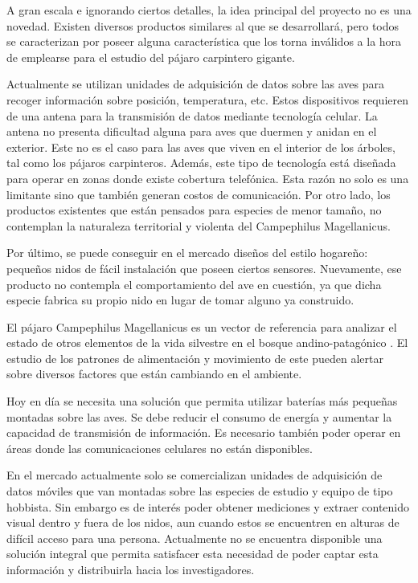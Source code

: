 %

%


A gran escala e ignorando ciertos detalles, la idea principal del proyecto no es una novedad. Existen diversos productos similares al que se desarrollará, pero todos se caracterizan por poseer alguna característica que los torna inválidos a la hora de emplearse para el estudio del pájaro carpintero gigante.

Actualmente se utilizan unidades de adquisición de datos sobre las aves para recoger información sobre posición, temperatura, etc. Estos dispositivos requieren de una antena para la transmisión de datos mediante tecnología celular. La antena no presenta dificultad alguna para aves que duermen y anidan en el exterior. Este no es el caso para las aves que viven en el interior de los árboles, tal como los pájaros carpinteros. Además, este tipo de tecnología está diseñada para operar en zonas donde existe cobertura telefónica. Esta razón no solo es una limitante sino que también generan costos de comunicación. Por otro lado, los productos existentes que están pensados para especies de menor tamaño, no contemplan la naturaleza territorial y violenta del Campephilus Magellanicus.

Por último, se puede conseguir en el mercado diseños del estilo hogareño: pequeños nidos de fácil instalación que poseen ciertos sensores. Nuevamente, ese producto no contempla el comportamiento del ave en cuestión, ya que dicha especie fabrica su propio nido en lugar de tomar alguno ya construido.


El pájaro Campephilus Magellanicus es un vector de referencia para analizar el estado de otros elementos de la vida silvestre en el bosque andino-patagónico \cite{ref:PaperValeriaOjeda}. El estudio de los patrones de alimentación y movimiento de este pueden alertar sobre diversos factores que están cambiando en el ambiente.

Hoy en día se necesita una solución que permita utilizar baterías más pequeñas montadas sobre las aves. Se debe reducir el consumo de energía y aumentar la capacidad de transmisión de información. Es necesario también poder operar en áreas donde las comunicaciones celulares no están disponibles.

En el mercado actualmente solo se comercializan unidades de adquisición de datos móviles que van montadas sobre las especies de estudio y equipo de tipo hobbista. Sin embargo es de interés poder obtener mediciones y extraer contenido visual dentro y fuera de los nidos, aun cuando estos se encuentren en alturas de difícil acceso para una persona. Actualmente no se encuentra disponible una solución integral que permita satisfacer esta necesidad de poder captar esta información y distribuirla hacia los investigadores.

%